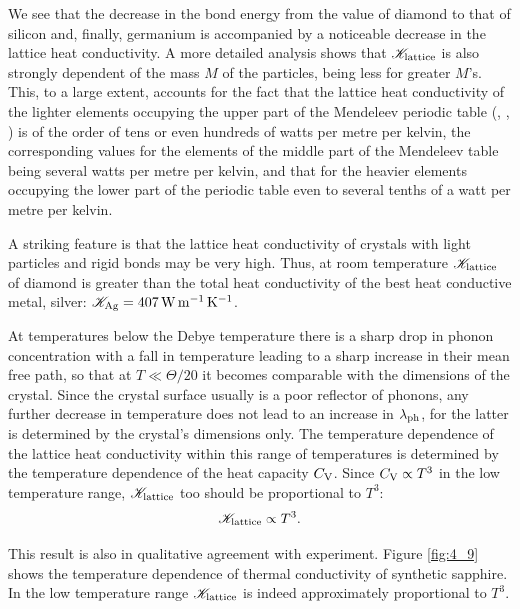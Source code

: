 We see that the decrease in the bond energy from the value of diamond to that of silicon and, finally, germanium is accompanied by a noticeable decrease in the lattice heat conductivity. A more detailed analysis shows that $\mathscr{K}_{\text{lattice}}$ is also strongly dependent of
the mass $M$ of the particles, being less for greater $M$'s. This, to a large extent, accounts for the fact that the lattice heat conductivity of the lighter elements occupying the upper part of the Mendeleev periodic table (, , ) is of the order of tens or even hundreds of watts per metre per kelvin, the corresponding values for the elements of the middle part of the Mendeleev table being several watts per metre per kelvin, and that for the heavier elements occupying the lower part of the periodic table even to several tenths of a watt per metre per kelvin.

A striking feature is that the lattice heat conductivity of crystals with light particles and rigid bonds may be very high. Thus, at room temperature $\mathscr{K}_{\text{lattice}}$ of diamond is greater than the total heat conductivity of the best heat conductive metal, silver: $\mathscr{K}_{\text{Ag}}=\SI{407}{\watt\per\metre\per\kelvin}$.

At temperatures below the Debye temperature there is a sharp drop in phonon concentration with a fall in temperature leading to a sharp increase in their mean free path, so that at $T\ll\Theta/20$ it becomes comparable with the dimensions of the crystal. Since the crystal surface usually is a poor reflector of phonons, any further decrease in temperature does not lead to an increase in $\lambda_{\text{ph}}$, for the latter is determined by the crystal's dimensions only. The temperature dependence of the lattice heat conductivity within this range of temperatures is determined by the temperature dependence of the heat capacity $C_{\text{V}}$. Since $C_{\text{V}}\propto T^3$ in the low temperature range,
$\mathscr{K}_{\text{lattice}}$ too should be proportional to $T^3$:
\begin{equation}\label{eq:4_56}
    \mathscr{K}_{\text{lattice}} \propto T^3.
\end{equation}

\noindent
This result is also in qualitative agreement with experiment. Figure \ref{fig:4_9} shows the temperature dependence of thermal conductivity of synthetic sapphire. In the low temperature range $\mathscr{K}_{\text{lattice}}$ is
indeed approximately proportional to $T^3$.

